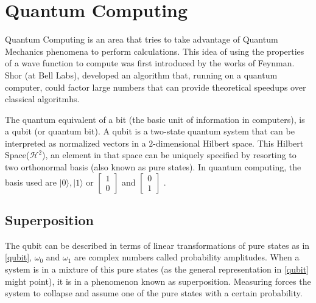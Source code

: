 

\clearpage
\section{Quantum Computing}
\label{sec:int_quantum_computing}



Quantum Computing is an area that tries to take advantage of Quantum Mechanics phenomena to perform calculations. This idea of using the properties of a wave function to compute was first introduced by the works of Feynman\cite{Feynman1982}. Shor (at Bell Labs), developed an algorithm that, running on a quantum computer, could factor large numbers that can provide theoretical speedups over classical algoritmhs\cite{Rieffel2011}.  

The quantum equivalent of a bit (the basic unit of information in computers), is a qubit (or quantum bit). A qubit is a two-state quantum system that can be interpreted as normalized vectors in a $2$-dimensional Hilbert space. This Hilbert Space($\mathcal{H}^2$), an element in that space can be uniquely specified by resorting to two orthonormal basis (also known as pure states). In quantum computing, the basis used are ${ \vert 0 \rangle , \vert 1 \rangle }$ or $\left[\begin{array}{c}
1\\
0
\end{array}\right]$
 and 
$\left[\begin{array}{c}
0\\
1
\end{array}\right]$ .

\subsection{Superposition}
\label{subsec:superposition}

The qubit can be described in terms of linear transformations of pure states as in \ref{qubit}, $\omega_{0}$ and $\omega_{1}$ are complex numbers called probability amplitudes. When a system is in a mixture of this pure states (as the general representation in \ref{qubit} might point), it is in a phenomenon known as superposition. Measuring forces the system to collapse and assume one of the pure states with a certain probability. 

